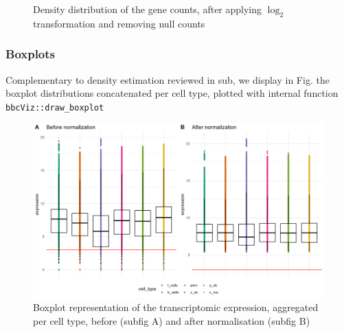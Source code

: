\begin{figure}

{\centering {}

}

\caption{Density distribution of the gene counts, after applying $\log_2$ transformation and removing null counts}\label{fig:kernel-plot-pdf}
\end{figure}


\subsubsection{Boxplots} 
\label{boxplots}

Complementary to density estimation reviewed in sub, we display in Fig.  the boxplot distributions concatenated per cell type, plotted with internal function \texttt{bbcViz::draw\_boxplot}

\begin{figure}

{\centering \includegraphics[width=0.9\linewidth]{figures/normalisation_boxplot} 

}

\caption{Boxplot representation of the transcriptomic expression, aggregated per cell type, before (subfig A) and after normalisation (subfig B)}\label{fig:vst-quality-boxplot}
\end{figure}

